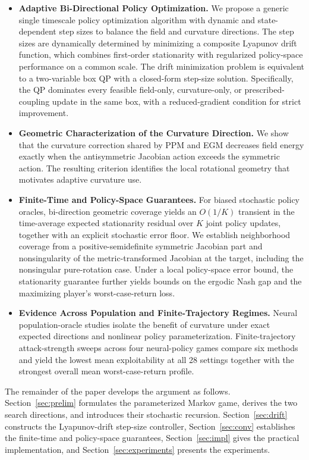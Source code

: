 \documentclass[journal]{IEEEtran}
\theoremstyle{remark}
\begin{document}
	\begin{itemize}[leftmargin=*,nosep]
\item \textbf{Adaptive Bi-Directional Policy Optimization.}
		We propose a generic single timescale policy optimization algorithm with dynamic and state-dependent step sizes to balance the field and curvature directions.
		The step sizes are dynamically determined by minimizing a composite Lyapunov drift function, which combines first-order stationarity with regularized policy-space performance on a common scale. The drift minimization problem is equivalent to a two-variable box QP with a closed-form step-size solution.
		Specifically, the QP dominates every feasible field-only, curvature-only, or prescribed-coupling update in the same box, with a reduced-gradient condition for strict improvement.
\item \textbf{Geometric Characterization of the Curvature Direction.}
		We show that the curvature correction shared by PPM and EGM decreases field energy exactly when the antisymmetric Jacobian action exceeds the symmetric action.
		The resulting criterion identifies the local rotational geometry that motivates adaptive curvature use.
\item \textbf{Finite-Time and Policy-Space Guarantees.}
		For biased stochastic policy oracles, bi-direction geometric coverage yields an $O(1/K)$ transient in the time-average expected stationarity residual over $K$ joint policy updates, together with an explicit stochastic error floor.
		We establish neighborhood coverage from a positive-semidefinite symmetric Jacobian part and nonsingularity of the metric-transformed Jacobian at the target, including the nonsingular pure-rotation case.
		Under a local policy-space error bound, the stationarity guarantee further yields bounds on the ergodic Nash gap and the maximizing player's worst-case-return loss.
\item \textbf{Evidence Across Population and Finite-Trajectory Regimes.}
Neural population-oracle studies isolate the benefit of curvature under exact expected directions and nonlinear policy parameterization.
Finite-trajectory attack-strength sweeps across four neural-policy games compare six methods and yield the lowest mean exploitability at all 28 settings together with the strongest overall mean worst-case-return profile.
	\end{itemize}
	
	The remainder of the paper develops the argument as follows.
	Section~\ref{sec:prelim} formulates the parameterized Markov game, derives the two search directions, and introduces their stochastic recursion.
	Section~\ref{sec:drift} constructs the Lyapunov-drift step-size controller, Section~\ref{sec:conv} establishes the finite-time and policy-space guarantees, Section~\ref{sec:impl} gives the practical implementation, and Section~\ref{sec:experiments} presents the experiments.
	
\end{document}
